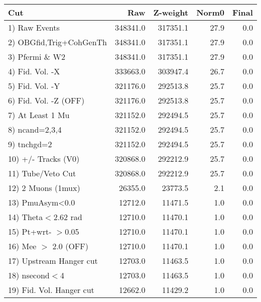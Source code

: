  \begin{table}[h!]\centering
 \begin{tabular}{||l||r|r|r|r||}
 \hline
 \hline
 Cut & Raw & Z-weight & Norm0 & Final \\
 \hline
  1) Raw Events           &    348341.0 &    317351.1 &        27.9 &         0.0 \\
  2) OBGfid,Trig+CohGenTh &    348341.0 &    317351.1 &        27.9 &         0.0 \\
  3) Pfermi \& W2         &    348341.0 &    317351.1 &        27.9 &         0.0 \\
  4) Fid. Vol. -X         &    333663.0 &    303947.4 &        26.7 &         0.0 \\
  5) Fid. Vol. -Y         &    321176.0 &    292513.8 &        25.7 &         0.0 \\
  6) Fid. Vol. -Z (OFF)   &    321176.0 &    292513.8 &        25.7 &         0.0 \\
  7) At Least 1 Mu        &    321152.0 &    292494.5 &        25.7 &         0.0 \\
  8) ncand=2,3,4          &    321152.0 &    292494.5 &        25.7 &         0.0 \\
  9) tnchgd=2             &    321152.0 &    292494.5 &        25.7 &         0.0 \\
 10) +/- Tracks (V0)      &    320868.0 &    292212.9 &        25.7 &         0.0 \\
 11) Tube/Veto Cut        &    320868.0 &    292212.9 &        25.7 &         0.0 \\
 12) 2 Muons (1mux)       &     26355.0 &     23773.5 &         2.1 &         0.0 \\
 13) PmuAsym<0.0          &     12712.0 &     11471.5 &         1.0 &         0.0 \\
 14) Theta$<$2.62 rad     &     12710.0 &     11470.1 &         1.0 &         0.0 \\
 15) Pt+wrt- $>$0.05      &     12710.0 &     11470.1 &         1.0 &         0.0 \\
 16) Mee $>$ 2.0  (OFF)   &     12710.0 &     11470.1 &         1.0 &         0.0 \\
 17) Upstream Hanger cut  &     12703.0 &     11463.5 &         1.0 &         0.0 \\
 18) nsecond$<$4          &     12703.0 &     11463.5 &         1.0 &         0.0 \\
 19) Fid. Vol. Hanger cut &     12662.0 &     11429.2 &         1.0 &         0.0 \\

\end{tabular}
\end{table}
